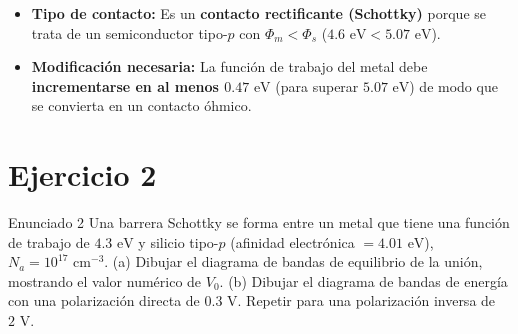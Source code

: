 \documentclass[11pt,a4paper]{article}
\begin{document}
\begin{center}
\end{center}

\begin{respuestabox}
\begin{itemize}
    \item \textbf{Tipo de contacto:} Es un \textbf{contacto rectificante (Schottky)} porque se trata de un semiconductor tipo-$p$ con $\Phi_m < \Phi_s$ ($4.6\text{ eV} < 5.07\text{ eV}$).
    \item \textbf{Modificación necesaria:} La función de trabajo del metal debe \textbf{incrementarse en al menos $0.47\text{ eV}$} (para superar $5.07\text{ eV}$) de modo que se convierta en un contacto óhmico.
\end{itemize}
\end{respuestabox}

\newpage

\section*{Ejercicio 2}
\begin{ejerciciobox}{Enunciado 2}
Una barrera Schottky se forma entre un metal que tiene una función de trabajo de $4.3\text{ eV}$ y silicio tipo-$p$ (afinidad electrónica $= 4.01\text{ eV}$), $N_a = 10^{17}\text{ cm}^{-3}$. (a) Dibujar el diagrama de bandas de equilibrio de la unión, mostrando el valor numérico de $V_0$. (b) Dibujar el diagrama de bandas de energía con una polarización directa de $0.3\text{ V}$. Repetir para una polarización inversa de $2\text{ V}$.
\end{ejerciciobox}
\end{document}
